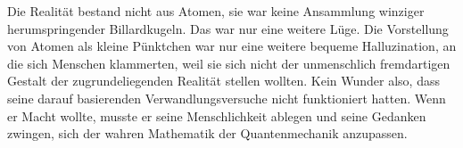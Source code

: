 Die Realität bestand nicht aus Atomen, sie war keine Ansammlung winziger herumspringender Billardkugeln. Das war nur eine weitere Lüge. Die Vorstellung von Atomen als kleine Pünktchen war nur eine weitere bequeme Halluzination, an die sich Menschen klammerten, weil sie sich nicht der unmenschlich fremdartigen Gestalt der zugrundeliegenden Realität stellen wollten. Kein Wunder also, dass seine darauf basierenden Verwandlungsversuche nicht funktioniert hatten. Wenn er Macht wollte, musste er seine Menschlichkeit ablegen und seine Gedanken zwingen, sich der wahren Mathematik der Quantenmechanik anzupassen.

